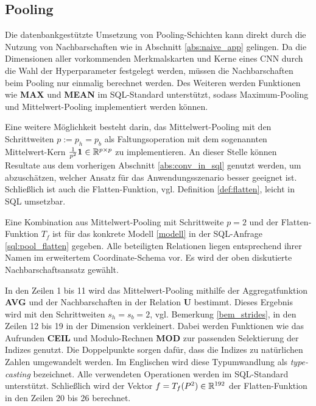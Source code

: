 

\subsection*{Pooling}
Die datenbankgestützte Umsetzung von Pooling-Schichten kann direkt durch die Nutzung von Nachbarschaften wie in Abschnitt \ref{abs:naive_app} gelingen. Da die Dimensionen aller vorkommenden Merkmalskarten und Kerne eines CNN durch die Wahl der Hyperparameter festgelegt werden, müssen die Nachbarschaften beim Pooling nur einmalig berechnet werden. Des Weiteren werden Funktionen wie \textbf{MAX} und \textbf{MEAN} im SQL-Standard unterstützt, sodass Maximum-Pooling und Mittelwert-Pooling implementiert werden können.

Eine weitere Möglichkeit besteht darin, das Mittelwert-Pooling mit den Schrittweiten $p:=p_h=p_b$ als Faltungsoperation mit dem sogenannten Mittelwert-Kern $\frac{1}{p^2} \mathbf{1} \in \mathbb{R}^{p \times p}$ zu implementieren. An dieser Stelle können Resultate aus dem vorherigen Abschnitt \ref{abs:conv_in_sql} genutzt werden, um abzuschätzen, welcher Ansatz für das Anwendungsszenario besser geeignet ist. Schließlich ist auch die Flatten-Funktion, vgl. Definition \ref{def:flatten}, leicht in SQL umsetzbar. 

Eine Kombination aus Mittelwert-Pooling mit Schrittweite $p=2$ und der Flatten-Funktion $T_f$ ist für das konkrete Modell \ref{modell} in der SQL-Anfrage \ref{sql:pool_flatten} gegeben. Alle beteiligten Relationen liegen entsprechend ihrer Namen im erweitertem Coordinate-Schema vor. Es wird der oben diskutierte Nachbarschaftsansatz gewählt.



In den Zeilen 1 bis 11 wird das Mittelwert-Pooling mithilfe der Aggregatfunktion \textbf{AVG} und der Nachbarschaften in der Relation \textbf{U} bestimmt. Dieses Ergebnis wird mit den Schrittweiten $s_h=s_b=2$, vgl. Bemerkung \ref{bem_strides}, in den Zeilen 12 bis 19 in der Dimension verkleinert. Dabei werden Funktionen wie das Aufrunden \textbf{CEIL} und Modulo-Rechnen \textbf{MOD} zur passenden Selektierung der Indizes genutzt. Die Doppelpunkte sorgen dafür, dass die Indizes zu natürlichen Zahlen umgewandelt werden. Im Englischen wird diese Typumwandlung als \textit{type-casting} bezeichnet. Alle verwendeten Operationen werden im SQL-Standard unterstützt. Schließlich wird der Vektor $f=T_f(P^2) \in \mathbb{R}^{192}$ der Flatten-Funktion in den Zeilen 20 bis 26 berechnet. 
 
